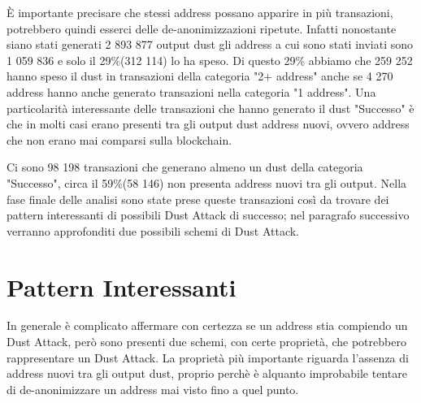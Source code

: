 È importante precisare che stessi address possano apparire in più transazioni, potrebbero quindi esserci delle de-anonimizzazioni ripetute. Infatti nonostante siano stati generati 2 893 877 output dust gli address a cui sono stati inviati sono 1 059 836 e solo il 29\%(312 114) lo ha speso. Di questo 29\% abbiamo che 259 252 hanno speso il dust in transazioni della categoria "2+ address" anche se 4 270 address hanno anche generato transazioni nella categoria "1 address". Una particolarità interessante delle transazioni che hanno generato il dust "Successo" è che in molti casi erano presenti tra gli output dust address nuovi, ovvero address che non erano mai comparsi sulla blockchain. 

Ci sono 98 198 transazioni che generano almeno un dust della categoria "Successo", circa il 59\%(58 146) non presenta address nuovi tra gli output. Nella fase finale delle analisi sono state prese queste transazioni così da trovare dei pattern interessanti di possibili Dust Attack di successo; nel paragrafo successivo verranno approfonditi due possibili schemi di Dust Attack.  
\section{Pattern Interessanti}
In generale è complicato affermare con certezza se un address stia compiendo un Dust Attack, però sono presenti due schemi, con certe proprietà, che potrebbero rappresentare un Dust Attack. La proprietà più importante riguarda l'assenza di address nuovi tra gli output dust, proprio perchè è alquanto improbabile tentare di de-anonimizzare un address mai visto fino a quel punto.


